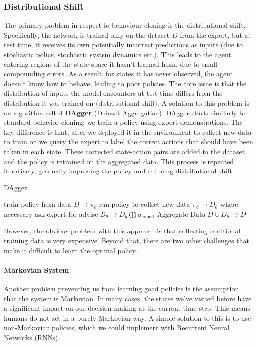 \subsubsection{Distributional Shift}
The primary problem in respect to behaviour cloning is the distributional shift. 
Specifically, the network is trained only on the dataset $D$ from the expert, but 
at test time, it receives its own potentially incorrect predictions as inputs (due to 
stochastic policy, stochastic system dynamics etc.). 
This leads to the agent entering regions of the state space it hasn't learned from, due to small 
compounding errors. As a result, for states it has never observed, the agent doesn't 
know how to behave, leading to poor policies. The core issue is that the distribution of inputs 
the model encounters at test time differs from the distribution it was trained on (distributional shift).\newline   
A solution to this problem is an algorithm called \textbf{DAgger} (Dataset Aggregation). DAgger starts similarly to standard behavior 
cloning: we train a policy using expert demonstrations. The key difference is that, after we deployed it in the environment to collect new 
data to train on we query the expert to label the correct actions that should have been taken in each state. These corrected state-action 
pairs are added to the dataset, and the policy is retrained on the aggregated data. This process is repeated iteratively, gradually improving 
the policy and reducing distributional shift.
\begin{algorithm}[H]
    \caption{DAgger}\label{algo:dagger}
    \begin{algorithmic}
    \STATE train policy from data $D \rightarrow \pi_{\theta}$
    \STATE run policy to collect new data $\pi_{\theta}\rightarrow D_{\theta}$
    \STATE where necessary ask expert for advise $D_{\theta} \rightarrow D_{\theta} \bigoplus a_{\text{expert}}$
    \STATE Aggregate Data $D \cup D_{\theta} \rightarrow D$    
    \ENDFOR
    \end{algorithmic}
\end{algorithm}
However, the obvious problem with this approach is that collecting additional training data is very expensive. 
Beyond that, there are two other challenges that make it difficult to learn the optimal policy.

\paragraph{Markovian System}
Another problem preventing us from learning good policies is the assumption that the 
system is Markovian. In many cases, the states we've visited before have a significant 
impact on our decision-making at the current time step. This means humans do not act in a 
purely Markovian way. A simple solution to this is to use non-Markovian policies, which we 
could implement with Recurrent Neural Networks (RNNs).

